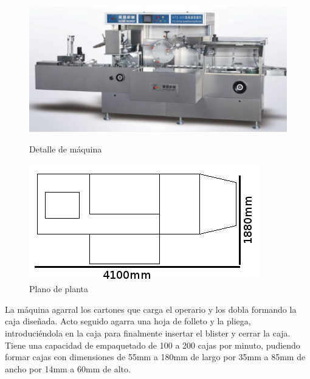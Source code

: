 	\begin{figure}[htp]
		\begin{minipage}{.48\textwidth}
			\centering
			\includegraphics[scale=0.4]{Datasheets/7Foto.png}
			\caption{Detalle de máquina}
			\label{fig:testa}
		\end{minipage}
		\begin{minipage}{.48\textwidth}
			\centering
			\includegraphics[scale=0.5]{Datasheets/Miniaturas/empaquetar.png}
			\caption{Plano de planta}
			\label{fig:testb}
		\end{minipage}
	\end{figure}

	

	La máquina agarral los cartones que carga el operario y los dobla formando la caja diseñada. Acto seguido agarra una hoja de folleto y la pliega, introduciéndola en la caja para finalmente insertar el blister y cerrar la caja.\\

	Tiene una capacidad de empaquetado de 100 a 200 cajas por minuto, pudiendo formar cajas con dimensiones de 55mm a 180mm de largo por 35mm a 85mm de ancho por 14mm a 60mm de alto.



